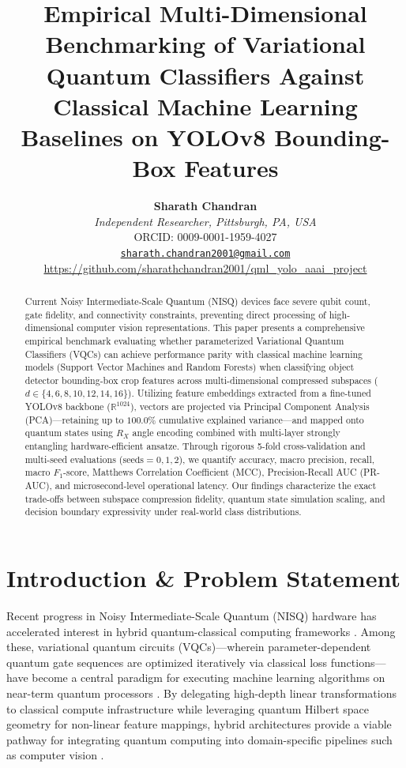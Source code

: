 \documentclass[10pt,twocolumn,letterpaper]{article}
\title{\Large\bfseries Empirical Multi-Dimensional Benchmarking of Variational Quantum Classifiers Against Classical Machine Learning Baselines on YOLOv8 Bounding-Box Features}
\author{
    \textbf{Sharath Chandran} \\
    \textit{Independent Researcher, Pittsburgh, PA, USA} \\
    ORCID: 0009-0001-1959-4027 \\
    \href{mailto:sharath.chandran2001@gmail.com}{\texttt{sharath.chandran2001@gmail.com}} \\
    \url{https://github.com/sharathchandran2001/qml_yolo_aaai_project}
}
\date{}
\begin{document}
\maketitle

\begin{abstract}
Current Noisy Intermediate-Scale Quantum (NISQ) devices face severe qubit count, gate fidelity, and connectivity constraints, preventing direct processing of high-dimensional computer vision representations. This paper presents a comprehensive empirical benchmark evaluating whether parameterized Variational Quantum Classifiers (VQCs) can achieve performance parity with classical machine learning models (Support Vector Machines and Random Forests) when classifying object detector bounding-box crop features across multi-dimensional compressed subspaces ($d \in \{4, 6, 8, 10, 12, 14, 16\}$). Utilizing feature embeddings extracted from a fine-tuned YOLOv8 backbone ($\mathbb{R}^{1024}$), vectors are projected via Principal Component Analysis (PCA)—retaining up to $100.0\%$ cumulative explained variance—and mapped onto quantum states using $R_X$ angle encoding combined with multi-layer strongly entangling hardware-efficient ansatze. Through rigorous 5-fold cross-validation and multi-seed evaluations ($\text{seeds}=0, 1, 2$), we quantify accuracy, macro precision, recall, macro $F_1$-score, Matthews Correlation Coefficient (MCC), Precision-Recall AUC (PR-AUC), and microsecond-level operational latency. Our findings characterize the exact trade-offs between subspace compression fidelity, quantum state simulation scaling, and decision boundary expressivity under real-world class distributions.
\end{abstract}

\section{Introduction \& Problem Statement}

Recent progress in Noisy Intermediate-Scale Quantum (NISQ) hardware has accelerated interest in hybrid quantum-classical computing frameworks \cite{ref5}. Among these, variational quantum circuits (VQCs)—wherein parameter-dependent quantum gate sequences are optimized iteratively via classical loss functions—have become a central paradigm for executing machine learning algorithms on near-term quantum processors \cite{ref1, ref2}. By delegating high-depth linear transformations to classical compute infrastructure while leveraging quantum Hilbert space geometry for non-linear feature mappings, hybrid architectures provide a viable pathway for integrating quantum computing into domain-specific pipelines such as computer vision \cite{ref3, ref4, ref5, ref6}.
\end{document}
